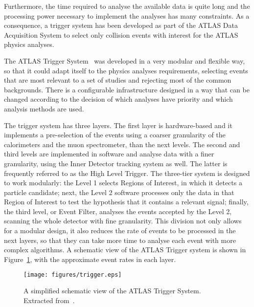 Furthermore, the time required to analyse the available data is quite
long and the processing power necessary to implement the analyses has
many constraints. As a consequence, a trigger system has been developed
as part of the ATLAS Data Acquisition System to select only collision events
with interest for the ATLAS physics analyses.

The ATLAS Trigger System~\cite{atlastrigger} was developed in a very modular and flexible way, so
that it could adapt itself to the physics analyses requirements, selecting
events that are most relevant to a set of studies and rejecting most of the
common backgrounds. There is a configurable infrastructure designed in a way
that can be changed according to the decision of which analyses have priority
and which analysis methods are used.

The trigger system has three layers. The first layer is hardware-based and it implements a pre-selection
of the events using a coarser granularity of the calorimeters and the muon spectrometer, than the next levels.
The second and third levels are implemented in software and analyse data
with a finer granularity, using the Inner Detector tracking system as well. The latter
is frequently referred to as the High Level Trigger.
The three-tier system is designed to work modularly: the Level 1 selects Regions
of Interest, in which it detects a particle candidate; next, the Level 2
software processes only the data in that Region of Interest to test the hypothesis
that it contains a relevant signal; finally, the third level, or Event Filter, analyses
the events accepted by the Level 2, scanning the whole detector with fine granularity.
This division not only allows for a modular design, it also reduces the rate of events
to be processed in the next layers, so that they can take more time
to analyse each event with more complex algorithms. A schematic view of the ATLAS Trigger system is shown
in Figure~\ref{fig:trigger}, with the approximate event rates in each layer.

\begin{figure}
\centering
\texttt{[image: figures/trigger.eps]}
\caption{A simplified schematic view of the ATLAS Trigger System. Extracted from~\cite{bjet_proc_pelle}.}
\label{fig:trigger}
\end{figure}

